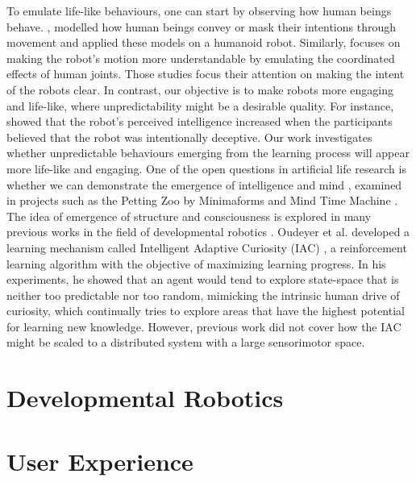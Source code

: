 To emulate life-like behaviours, one can start by observing how human beings behave. \cite{Dragan2015}, \cite{Dragan2014} modelled how human beings convey or mask their intentions through movement and applied these models on a humanoid robot. Similarly, \cite{Gielniak2013} focuses on making the robot’s motion more understandable by emulating the coordinated effects of human joints. Those studies focus their attention on making the intent of the robots clear. In contrast, our objective is to make robots more engaging and life-like, where unpredictability might be a desirable quality. For instance, \cite{Dragan2014} showed that the robot’s perceived intelligence increased when the participants believed that the robot was intentionally deceptive. Our work investigates whether unpredictable behaviours emerging from the learning process will appear more life-like and engaging.
One of the open questions in artificial life research is whether we can demonstrate the emergence of intelligence and mind \cite{Bedau2000}, examined in projects such as the Petting Zoo by Minimaforms \cite{Minimaforms} and Mind Time Machine \cite{Ikegami2013}.   The idea of emergence of structure and consciousness is explored in many previous works in the field of developmental robotics \cite{Lungarella2003} \cite{Asada2009} \cite{Kompella2014}.  Oudeyer et al. developed a learning mechanism called Intelligent Adaptive Curiosity (IAC) \cite{Oudeyer2007}, a reinforcement learning algorithm with the objective of maximizing learning progress. In his experiments, he showed that an agent would tend to explore state-space that is neither too predictable nor too random, mimicking the intrinsic human drive of curiosity, which continually tries to explore areas that have the highest potential for learning new knowledge. However, previous work did not cover how the IAC might be scaled to a distributed system with a large sensorimotor space. 

\section{Developmental Robotics}




\section{User Experience}
